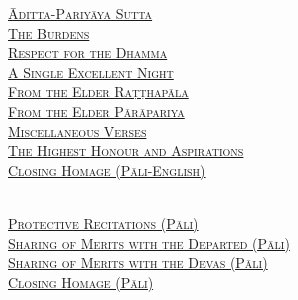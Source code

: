 {  \textsc{\ifafiveversion\fontsize{14.4}{28}\fi\ifasixversion\fontsize{10}{20}\fi\selectfont
    \hyperref[aditta-pariyaya]{Āditta-Pariyāya Sutta} \ifdigitalversion\else\pageref{aditta-pariyaya}\fi\\
    \hyperref[burdens]{The Burdens} \ifdigitalversion\else\pageref{burdens}\fi\\
    \hyperref[respect-for-the-dhamma]{Respect for the Dhamma} \ifdigitalversion\else\pageref{respect-for-the-dhamma}\fi\\
    \hyperref[single-excellent-night]{A Single Excellent Night} \ifdigitalversion\else\pageref{single-excellent-night}\fi\\
    \hyperref[ratthapala]{From the Elder Raṭṭhapāla}  \ifdigitalversion\else\pageref{ratthapala}\fi\\
    \hyperref[parapariya]{From the Elder Pārāpariya} \ifdigitalversion\else\pageref{parapariya}\fi\\
    \hyperref[misc-verses]{Miscellaneous Verses} \ifdigitalversion\else\pageref{misc-verses}\fi\\
    \hyperref[highest-honour-aspirations]{The Highest Honour and Aspirations} \ifdigitalversion\else\pageref{highest-honour-aspirations}\fi\\
    \hyperref[closing-homage]{Closing Homage (Pāli-English)} \ifdigitalversion\else\pageref{closing-homage}\fi\\
  }

  \clearpage

  {\libertinusFont\selectfont\textbf{\textsc{\ifafiveversion\fontsize{18}{12}\fi\ifasixversion\fontsize{13}{8.5}\fi\selectfont{}}}}\\

  \textsc{\ifafiveversion\fontsize{14.4}{28}\fi\ifasixversion\fontsize{10}{20}\fi\selectfont
    \hyperref[deva-aradhana]{Protective Recitations (Pāli)} \ifdigitalversion\else\pageref{deva-aradhana}\fi\\
    \hyperref[sharing-merits-departed]{Sharing of Merits with the Departed (Pāli)} \ifdigitalversion\else\pageref{sharing-merits-departed}\fi\\
    \hyperref[sharing-merits-devas]{Sharing of Merits with the Devas (Pāli)} \ifdigitalversion\else\pageref{sharing-merits-devas}\fi\\
    \hyperref[closing-homage]{Closing Homage (Pāli)} \ifdigitalversion\else\pageref{closing-homage}\fi\\
  }

  \vspace{1.0cm}

}
